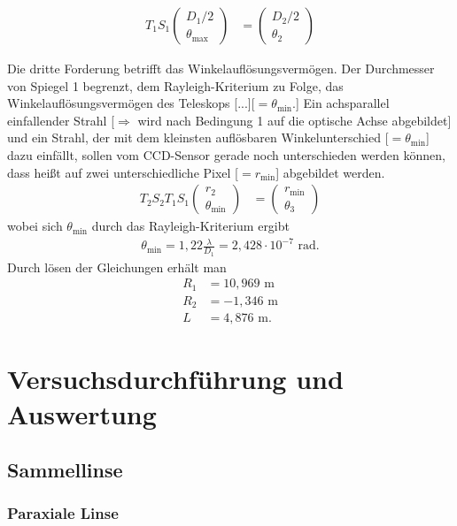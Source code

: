\documentclass[twoside,colorback,accentcolor=tud4c,11pt]{tudreport}
\begin{document}
\begin{align}
T_1S_1\begin{pmatrix}
D_1/2\\
\theta_{\text{max}}
\end{pmatrix}
&=\begin{pmatrix}
D_2/2\\
\theta_2
\end{pmatrix}
\end{align}

\glqq Die dritte Forderung betrifft das Winkelauflösungsvermögen. Der Durchmesser von Spiegel 1 begrenzt, dem Rayleigh-Kriterium zu Folge, das Winkelauflösungsvermögen des Teleskops [...][$ =\theta_{\text{min}} $.] Ein achsparallel einfallender Strahl [$\Rightarrow$ wird nach Bedingung 1 auf die optische Achse abgebildet] und ein Strahl, der mit dem kleinsten auflösbaren Winkelunterschied [$ =\theta_{\text{min}} $] dazu einfällt, sollen vom CCD-Sensor gerade noch unterschieden werden können, dass heißt auf zwei unterschiedliche Pixel [$ =r_{\text{min}} $] abgebildet werden.\grqq\, \cite{anl}
\begin{align}
T_2S_2T_1S_1\begin{pmatrix}
r_2\\
\theta_{\text{min}}
\end{pmatrix}
&=\begin{pmatrix}
r_{\text{min}}\\
\theta_3
\end{pmatrix}
\end{align}
wobei sich $ \theta_{\text{min}} $ durch das Rayleigh-Kriterium ergibt
\begin{align}
\theta_{\text{min}}=1,22\frac{\lambda}{D_1}=2,428\cdot 10^{-7}\text{ rad}.
\end{align}
Durch lösen der Gleichungen erhält man
\begin{align}
R_1&=10,969\text{ m}\\
R_2&=-1,346\text{ m}\\
L&=4,876\text{ m}.
\end{align}
\chapter{Versuchsdurchführung und Auswertung}
	\section{Sammellinse}
		\subsection{Paraxiale Linse}
		
\end{document}
